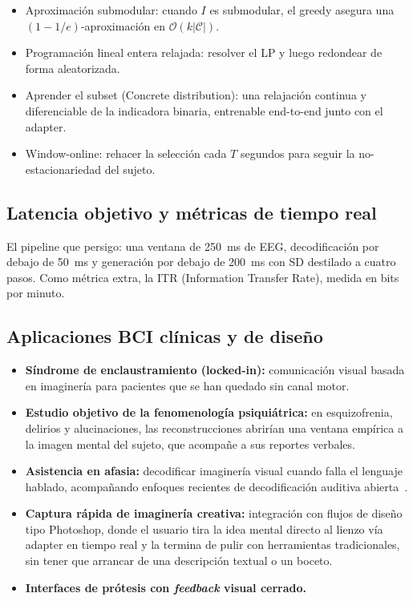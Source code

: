 \begin{itemize}
\item[•] Aproximación submodular: cuando $I$ es submodular, el greedy asegura una 
$(1-1/e)$-aproximación en $\mathcal{O}(k|\mathcal{C}|)$.
\item[•] Programación lineal entera relajada: resolver el LP y luego redondear de forma 
aleatorizada.
\item[•] Aprender el subset (Concrete distribution): una relajación continua y diferenciable 
de la indicadora binaria, entrenable end-to-end junto con el adapter.
\item[•] Window-online: rehacer la selección cada $T$ segundos para seguir la no-estacionariedad 
del sujeto.
\end{itemize}

\subsection{Latencia objetivo y métricas de tiempo real}

El pipeline que persigo: una ventana de 250~ms de EEG, decodificación por debajo de 50~ms y 
generación por debajo de 200~ms con SD destilado a cuatro pasos. Como métrica extra, la ITR 
(Information Transfer Rate), medida en bits por minuto.

\subsection{Aplicaciones BCI clínicas y de diseño}

\begin{itemize}
\item[•] \textbf{Síndrome de enclaustramiento (locked-in):} comunicación visual basada en imaginería 
para pacientes que se han quedado sin canal motor.
\item[•] \textbf{Estudio objetivo de la fenomenología psiquiátrica:} en esquizofrenia, delirios y 
alucinaciones, las reconstrucciones abrirían una ventana empírica a la imagen mental del 
sujeto, que acompañe a sus reportes verbales.
\item[•] \textbf{Asistencia en afasia:} decodificar imaginería visual cuando falla el lenguaje 
hablado, acompañando enfoques recientes de decodificación auditiva abierta~\cite{chen2023openvocab}.
\item[•] \textbf{Captura rápida de imaginería creativa:} integración con flujos de diseño tipo 
Photoshop, donde el usuario tira la idea mental directo al lienzo vía adapter en tiempo real y 
la termina de pulir con herramientas tradicionales, sin tener que arrancar de una descripción 
textual o un boceto.
\item[•] \textbf{Interfaces de prótesis con \textit{feedback} visual cerrado.}
\end{itemize}

